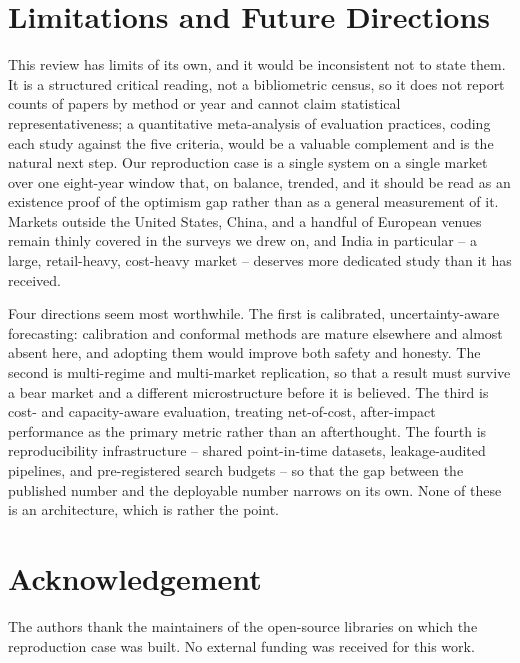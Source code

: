 \documentclass[10pt,a4paper,twocolumn]{article}
\begin{document}
\section{Limitations and Future Directions}

This review has limits of its own, and it would be inconsistent not to state them. It is a structured critical reading, not a bibliometric census, so it does not report counts of papers by method or year and cannot claim statistical representativeness; a quantitative meta-analysis of evaluation practices, coding each study against the five criteria, would be a valuable complement and is the natural next step. Our reproduction case is a single system on a single market over one eight-year window that, on balance, trended, and it should be read as an existence proof of the optimism gap rather than as a general measurement of it. Markets outside the United States, China, and a handful of European venues remain thinly covered in the surveys we drew on, and India in particular -- a large, retail-heavy, cost-heavy market -- deserves more dedicated study than it has received.

Four directions seem most worthwhile. The first is calibrated, uncertainty-aware forecasting: calibration and conformal methods are mature elsewhere and almost absent here, and adopting them would improve both safety and honesty. The second is multi-regime and multi-market replication, so that a result must survive a bear market and a different microstructure before it is believed. The third is cost- and capacity-aware evaluation, treating net-of-cost, after-impact performance as the primary metric rather than an afterthought. The fourth is reproducibility infrastructure -- shared point-in-time datasets, leakage-audited pipelines, and pre-registered search budgets -- so that the gap between the published number and the deployable number narrows on its own. None of these is an architecture, which is rather the point.

\section*{Acknowledgement}
{\small The authors thank the maintainers of the open-source libraries on which the reproduction case was built. No external funding was received for this work.}
\end{document}
